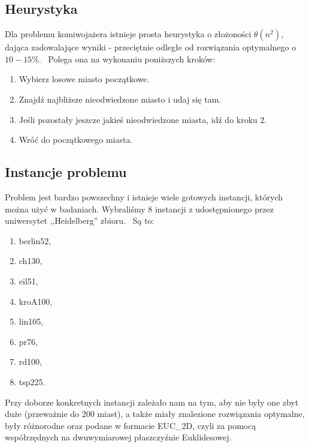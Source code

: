 \subsection{Heurystyka}

Dla problemu komiwojażera istnieje prosta heurystyka o złożoności $\theta(n^2)$, dająca zadowalające wyniki - przeciętnie odległe od rozwiązania optymalnego o~$10-15\%$.~\cite{Heuristic} Polega ona na wykonaniu poniższych kroków:

\begin{enumerate}
    \item Wybierz losowe miasto początkowe.
    \item Znajdź najbliższe nieodwiedzone miasto i udaj się tam.
    \item Jeśli pozostały jeszcze jakieś nieodwiedzone miasta, idź do kroku 2.
    \item Wróć do początkowego miasta.
\end{enumerate}

\subsection{Instancje problemu}

Problem jest bardzo powszechny i istnieje wiele gotowych instancji, których można użyć w badaniach. Wybraliśmy 8 instancji z udostępnionego przez uniwersytet ,,Heidelberg'' zbioru.~\cite{instances} Są to:

\begin{enumerate}
    \item berlin52,
    \item ch130,
    \item eil51,
    \item kroA100,
    \item lin105,
    \item pr76,
    \item rd100,
    \item tsp225.
\end{enumerate}

Przy doborze konkretnych instancji zależało nam na tym, aby nie były one zbyt duże (przeważnie do 200 miast), a także miały znalezione rozwiązania optymalne, były różnorodne oraz podane w formacie EUC\_2D, czyli za pomocą współrzędnych na dwuwymiarowej płaszczyźnie Euklidesowej.